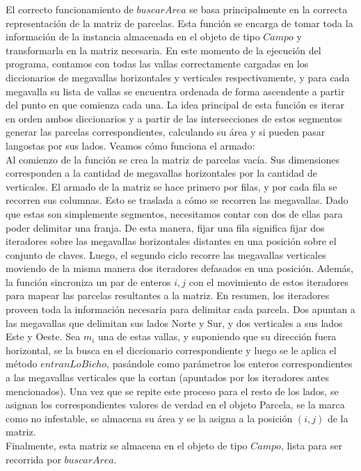 El correcto funcionamiento de $buscarArea$ se basa principalmente en la correcta representación de la matriz de parcelas. Esta función se encarga de tomar toda la información de la instancia almacenada en el objeto de tipo $Campo$ y transformarla en la matriz necesaria. En este momento de la ejecución del programa, contamos con todas las vallas correctamente cargadas en los diccionarios de megavallas horizontales y verticales respectivamente, y para cada megavalla su lista de vallas se encuentra ordenada de forma ascendente a partir del punto en que comienza cada una. La idea principal de esta función es iterar en orden ambos diccionarios y a partir de las intersecciones de estos segmentos generar las parcelas correspondientes, calculando su área y si pueden pasar langostas por sus lados. Veamos cómo funciona el armado:\\
\indent Al comienzo de la función se crea la matriz de parcelas vacía. Sus dimensiones corresponden a la cantidad de megavallas horizontales por la cantidad de verticales. El armado de la matriz se hace primero por filas, y por cada fila se recorren sus columnas. Esto se traslada a cómo se recorren las megavallas. Dado que estas son simplemente segmentos, necesitamos contar con dos de ellas para poder delimitar una franja. De esta manera, fijar una fila significa fijar dos iteradores sobre las megavallas horizontales distantes en una posición sobre el conjunto de claves. Luego, el segundo ciclo recorre las megavallas verticales moviendo de la misma manera dos iteradores defasados en una posición. Además, la función sincroniza un par de enteros $i,j$ con el movimiento de estos iteradores para mapear las parcelas resultantes a la matriz. En resumen, los iteradores proveen toda la información necesaria para delimitar cada parcela. Dos apuntan a las megavallas que delimitan sus lados Norte y Sur, y dos verticales a sus lados Este y Oeste. Sea $m_{i}$ una de estas vallas, y suponiendo que su dirección fuera horizontal, se la busca en el diccionario correspondiente y luego se le aplica el método $entranLoBicho$, pasándole como parámetros los enteros correspondientes a las megavallas verticales que la cortan (apuntados por los iteradores antes mencionados). Una vez que se repite este proceso para el resto de los lados, se asignan los correspondientes valores de verdad en el objeto Parcela, se la marca como no infestable, se almacena su área y se la asigna a la posición $(i,j)$ de la matriz.\\
\indent Finalmente, esta matriz se almacena en el objeto de tipo $Campo$, lista para ser recorrida por $buscarArea$.\\

